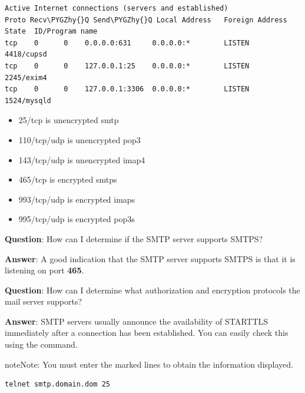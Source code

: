\documentclass[letterpaper,10pt,english]{sphinxmanual}
\def\PYGZhy{\char`\-}
\begin{document}
\begin{Verbatim}[commandchars=\\\{\}]
Active Internet connections (servers and established)
Proto Recv\PYGZhy{}Q Send\PYGZhy{}Q Local Address   Foreign Address  State  ID/Program name
tcp    0      0    0.0.0.0:631     0.0.0.0:*        LISTEN   4418/cupsd
tcp    0      0    127.0.0.1:25    0.0.0.0:*        LISTEN   2245/exim4
tcp    0      0    127.0.0.1:3306  0.0.0.0:*        LISTEN   1524/mysqld
\end{Verbatim}
\begin{itemize}
\item {} 
25/tcp is unencrypted smtp

\item {} 
110/tcp/udp is unencrypted pop3

\item {} 
143/tcp/udp is unencrypted imap4

\item {} 
465/tcp is encrypted smtps

\item {} 
993/tcp/udp is encrypted imaps

\item {} 
995/tcp/udp is encrypted pop3s

\end{itemize}

\textbf{Question}: How can I determine if the SMTP server supports SMTPS?

\textbf{Answer}: A good indication that the SMTP server supports SMTPS is that it
is listening on port \textbf{465}.

\textbf{Question}: How can I determine what authorization and encryption protocols
the mail server supports?

\textbf{Answer}: SMTP servers usually announce the availability of STARTTLS
immediately after a connection has been established. You can easily check this
using the  command.

\begin{notice}{note}{Note:}
You must enter the marked lines to obtain the information displayed.
\end{notice}

\begin{Verbatim}[commandchars=\\\{\}]
telnet smtp.domain.dom 25
\end{Verbatim}
\end{document}
